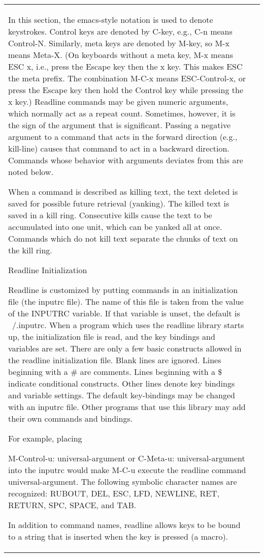 \documentclass[11pt]{article}
\begin{document}
\begin{longtable}{p{}p{}}
{{{In this section, the emacs-style notation is used to denote keystrokes. Control keys are denoted by C-key, e.g., C-n means Control-N. Similarly, meta keys are denoted by M-key, so M-x means Meta-X. (On keyboards without a meta key, M-x means ESC x, i.e., press the Escape key then the x key. This makes ESC the meta prefix. The combination M-C-x means ESC-Control-x, or press the Escape key then hold the Control key while pressing the x key.)
Readline commands may be given numeric arguments, which normally act as a repeat count. Sometimes, however, it is the sign of the argument that is significant. Passing a negative argument to a command that acts in the forward direction (e.g., kill-line) causes that command to act in a backward direction. Commands whose behavior with arguments deviates from this are noted below.

When a command is described as killing text, the text deleted is saved for possible future retrieval (yanking). The killed text is saved in a kill ring. Consecutive kills cause the text to be accumulated into one unit, which can be yanked all at once. Commands which do not kill text separate the chunks of text on the kill ring.

Readline Initialization

Readline is customized by putting commands in an initialization file (the inputrc file). The name of this file is taken from the value of the INPUTRC variable. If that variable is unset, the default is ~/.inputrc. When a program which uses the readline library starts up, the initialization file is read, and the key bindings and variables are set. There are only a few basic constructs allowed in the readline initialization file. Blank lines are ignored. Lines beginning with a # are comments. Lines beginning with a \$ indicate conditional constructs. Other lines denote key bindings and variable settings.
The default key-bindings may be changed with an inputrc file. Other programs that use this library may add their own commands and bindings.

For example, placing

M-Control-u: universal-argument
or
C-Meta-u: universal-argument
into the inputrc would make M-C-u execute the readline command universal-argument.
The following symbolic character names are recognized: RUBOUT, DEL, ESC, LFD, NEWLINE, RET, RETURN, SPC, SPACE, and TAB.

In addition to command names, readline allows keys to be bound to a string that is inserted when the key is pressed (a macro).

}}}
\end{longtable}
\end{document}
